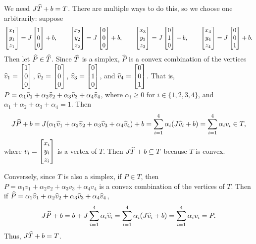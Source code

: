 \documentclass{homework}
\begin{document}
\begin{alphaparts}
		\questionpart We need $J\widehat{T} + b = T$. There are multiple ways to do this, so we choose one arbitrarily: suppose
		\begin{equation}
			\label{eq:p2d}
			\left[\begin{matrix}x_1 \\ y_1 \\ z_1\end{matrix}\right] = J\left[\begin{matrix}1 \\ 0 \\ 0\end{matrix}\right] + b, \qquad \left[\begin{matrix}x_2 \\ y_2 \\ z_2\end{matrix}\right] = J\left[\begin{matrix}0 \\ 0 \\ 0\end{matrix}\right] + b, \qquad \left[\begin{matrix}x_3 \\ y_3 \\ z_3\end{matrix}\right] = J\left[\begin{matrix}0 \\ 1 \\ 0\end{matrix}\right] + b, \qquad \left[\begin{matrix}x_4 \\ y_4 \\ z_4\end{matrix}\right] = J\left[\begin{matrix}0 \\ 0 \\ 1\end{matrix}\right] + b.
		\end{equation}
		Then let $\widehat{P} \in \widehat{T}$. Since $\widehat{T}$ is a simplex, $\widehat{P}$ is a convex combination of the vertices $\widehat{v}_1=\left[\begin{matrix}1 \\ 0 \\ 0\end{matrix}\right]$, $\widehat{v}_2=\left[\begin{matrix}0 \\ 0 \\0\end{matrix}\right]$, $\widehat{v}_3=\left[\begin{matrix}0 \\ 1\\ 0\end{matrix}\right]$, and $\widehat{v}_4 = \left[\begin{matrix}0 \\ 0 \\ 1\end{matrix}\right]$. That is, $P = \alpha_1\widehat{v}_1 + \alpha_2\widehat{v}_2 + \alpha_3\widehat{v}_3 + \alpha_4\widehat{v}_4$, where $\alpha_i \ge 0$ for $i \in \{1,2,3, 4\}$, and $\alpha_1+\alpha_2+\alpha_3 + \alpha_4 = 1$. Then
		\begin{equation*}
			J\widehat{P}+b = J(\alpha_1\widehat{v}_1 + \alpha_2\widehat{v}_2 + \alpha_3\widehat{v}_3 + \alpha_4\widehat{v}_4) + b = \sum_{i=1}^4\alpha_i(J\widehat{v}_i + b) = \sum_{i=1}^4\alpha_iv_i \in T,
		\end{equation*}
		where $v_i = \left[\begin{matrix}x_i \\ y_i \\ z_i\end{matrix}\right]$ is a vertex of $T$. Then $J\widehat{T} + b \subseteq T$ because $T$ is convex. 
		
		Conversely, since $T$ is also a simplex, if $P \in T$, then $P = \alpha_1v_1 + \alpha_2v_2 + \alpha_3v_3 + \alpha_4v_4$ is a convex combination of the vertices of $T$. Then if $\widehat{P} = \alpha_1\widehat{v}_1 + \alpha_2\widehat{v}_2 + \alpha_3\widehat{v}_3+\alpha_4\widehat{v}_4$,
		\begin{equation*}
			J\widehat{P} + b = b + J\sum_{i=1}^4\alpha_i\widehat{v}_i = \sum_{i=1}^4\alpha_i(J\widehat{v}_i + b) = \sum_{i=1}^4\alpha_iv_i = P.
		\end{equation*}
		Thus, $J\widehat{T} + b= T$.
		

\end{alphaparts}
\end{document}
